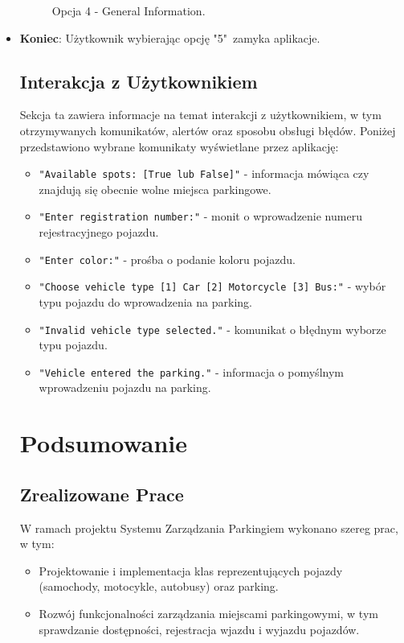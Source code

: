 \documentclass{article}
\begin{document}
\begin{itemize}
\begin{figure}[H]
        \caption{Opcja 4 - General Information.}
        \end{figure} 
\item \textbf{Koniec}:
    Użytkownik wybierając opcję "5"\ zamyka aplikacje.
\clearpage
\subsection{Interakcja z Użytkownikiem}
Sekcja ta zawiera informacje na temat interakcji z użytkownikiem, w tym otrzymywanych komunikatów, alertów oraz sposobu obsługi błędów. Poniżej przedstawiono wybrane komunikaty wyświetlane przez aplikację:

\begin{itemize}
    \item \texttt{"Available spots: [True lub False]"} - informacja mówiąca czy znajdują się obecnie wolne miejsca parkingowe.
    \item \texttt{"Enter registration number:"} - monit o wprowadzenie numeru rejestracyjnego pojazdu.
    \item \texttt{"Enter color:"} - prośba o podanie koloru pojazdu.
    \item \texttt{"Choose vehicle type [1] Car [2] Motorcycle [3] Bus:"} - wybór typu pojazdu do wprowadzenia na parking.
    \item \texttt{"Invalid vehicle type selected."} - komunikat o błędnym wyborze typu pojazdu.
    \item \texttt{"Vehicle entered the parking."} - informacja o pomyślnym wprowadzeniu pojazdu na parking.
    
    
\end{itemize}


\section{Podsumowanie}

\subsection{Zrealizowane Prace}
W ramach projektu Systemu Zarządzania Parkingiem wykonano szereg prac, w tym:
\begin{itemize}
    \item Projektowanie i implementacja klas reprezentujących pojazdy (samochody, motocykle, autobusy) oraz parking.
    \item Rozwój funkcjonalności zarządzania miejscami parkingowymi, w tym sprawdzanie dostępności, rejestracja wjazdu i wyjazdu pojazdów.
    

\end{itemize}
\end{itemize}
\end{document}
